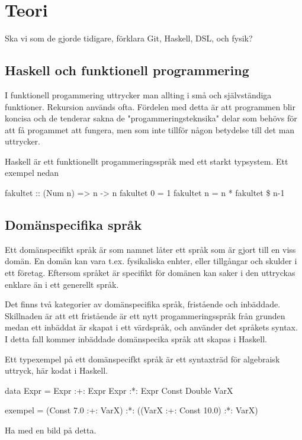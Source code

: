 
\chapter{Teori}

Ska vi som de gjorde tidigare, förklara Git, Haskell, DSL, och fysik?

\section{Haskell och funktionell programmering}

I funktionell progammering uttrycker man allting i små och självständiga funktioner. Rekursion används ofta. Fördelen med detta är att programmen blir koncisa och de tenderar sakna de "progammeringsteknsika" delar som behövs för att få progammet att fungera, men som inte tillför någon betydelse till det man uttrycker.

Haskell är ett funktionellt progammeringsspråk med ett starkt typsystem. Ett exempel nedan

    fakultet :: (Num n) => n -> n
    fakultet 0 = 1
    fakultet n = n * fakultet \$ n-1

\section{Domänspecifika språk}

Ett domänspecifikt språk är som namnet låter ett språk som är gjort till en viss domän. En domän kan vara t.ex. fysikaliska enhter, eller tillgångar och skulder i ett företag. Eftersom språket är specifikt för domänen kan saker i den uttryckas enklare än i ett generellt språk.

Det finns två kategorier av domänspecifika språk, fristående och inbäddade. Skillnaden är att ett fristående är ett nytt progammeringsspråk från grunden medan ett inbäddat är skapat i ett värdspråk, och använder det språkets syntax. I detta fall kommer inbäddade domänspecika språk att skapas i Haskell.

Ett typexempel på ett domänspecifkt språk är ett syntaxträd för algebraisk uttryck, här kodat i Haskell.

    data Expr = Expr :+: Expr
                Expr :*: Expr
                Const Double
                VarX

    exempel = (Const 7.0 :+: VarX) :*: ((VarX :+: Const 10.0) :*: VarX)

Ha med en bild på detta.

